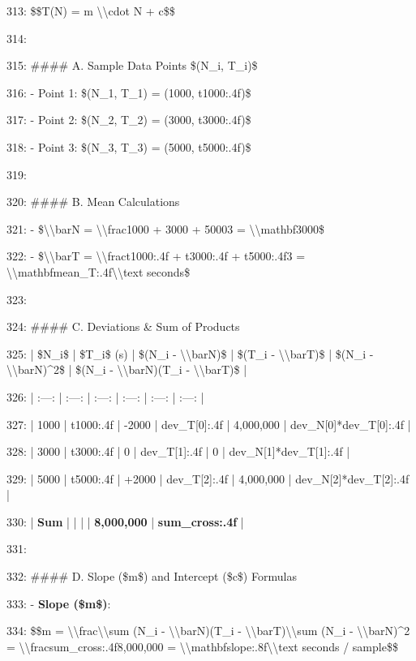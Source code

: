 \documentclass[11pt,a4paper]{article}
\begin{document}
{313: \$\$T(N) = m \textbackslash{}\textbackslash{}cdot N + c\$\$

314:

315: \#\#\#\# A. Sample Data Points \$(N\_i, T\_i)\$

316: - Point 1: \$(N\_1, T\_1) = (1000, {t1000:.4f})\$

317: - Point 2: \$(N\_2, T\_2) = (3000, {t3000:.4f})\$

318: - Point 3: \$(N\_3, T\_3) = (5000, {t5000:.4f})\$

319:

320: \#\#\#\# B. Mean Calculations

321: - \$\textbackslash{}\textbackslash{}bar{{N}} = \textbackslash{}\textbackslash{}frac{{1000 + 3000 + 5000}}{{3}} = \textbackslash{}\textbackslash{}mathbf{{3000}}\$

322: - \$\textbackslash{}\textbackslash{}bar{{T}} = \textbackslash{}\textbackslash{}frac{{{t1000:.4f} + {t3000:.4f} + {t5000:.4f}}}{{3}} = \textbackslash{}\textbackslash{}mathbf{{{mean\_T:.4f}\textbackslash{}\textbackslash{}text{{ seconds}}}}\$

323:

324: \#\#\#\# C. Deviations \& Sum of Products

325: | \$N\_i\$ | \$T\_i\$ (s) | \$(N\_i - \textbackslash{}\textbackslash{}bar{{N}})\$ | \$(T\_i - \textbackslash{}\textbackslash{}bar{{T}})\$ | \$(N\_i - \textbackslash{}\textbackslash{}bar{{N}})\textasciicircum{}2\$ | \$(N\_i - \textbackslash{}\textbackslash{}bar{{N}})(T\_i - \textbackslash{}\textbackslash{}bar{{T}})\$ |

326: | :---: | :---: | :---: | :---: | :---: | :---: |

327: | 1000 | {t1000:.4f} | -2000 | {dev\_T[0]:.4f} | 4,000,000 | {dev\_N[0]*dev\_T[0]:.4f} |

328: | 3000 | {t3000:.4f} | 0 | {dev\_T[1]:.4f} | 0 | {dev\_N[1]*dev\_T[1]:.4f} |

329: | 5000 | {t5000:.4f} | +2000 | {dev\_T[2]:.4f} | 4,000,000 | {dev\_N[2]*dev\_T[2]:.4f} |

330: | \textbf{Sum} | | | | \textbf{8,000,000} | \textbf{{sum\_cross:.4f}} |

331:

332: \#\#\#\# D. Slope (\$m\$) and Intercept (\$c\$) Formulas

333: - \textbf{Slope (\$m\$)}:

334:   \$\$m = \textbackslash{}\textbackslash{}frac{{\textbackslash{}\textbackslash{}sum (N\_i - \textbackslash{}\textbackslash{}bar{{N}})(T\_i - \textbackslash{}\textbackslash{}bar{{T}})}}{{\textbackslash{}\textbackslash{}sum (N\_i - \textbackslash{}\textbackslash{}bar{{N}})\textasciicircum{}2}} = \textbackslash{}\textbackslash{}frac{{{sum\_cross:.4f}}}{{8,000,000}} = \textbackslash{}\textbackslash{}mathbf{{{slope:.8f}\textbackslash{}\textbackslash{}text{{ seconds / sample}}}}\$\$

}
\end{document}
